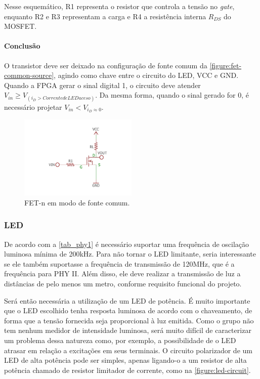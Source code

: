 	Nesse esquemático, R1 representa o resistor que controla a tensão no \textit{gate}, enquanto R2 e R3 representam a carga e R4 a resistência interna $R_{DS}$ do MOSFET.

	\paragraph*{Conclusão}

	O transistor deve ser deixado na configuração de fonte comum da \autoref{figure:fet-common-source}, agindo como chave entre o circuito do LED, VCC e GND. Quando a FPGA gerar o sinal digital 1, o circuito deve atender $V_{in} \geq V_{(i_{D} > Corrente de LED aceso)}$. Da mesma forma, quando o sinal gerado for 0, é necessário projetar  $V_{in} < V_{i_{D} \approx 0}$.

	\begin{figure}[h]
		\caption{\label{figure:fet-common-source}FET-n em modo de fonte comum.}
		\centering
		\includegraphics[width=0.5\textwidth, trim={0cm 2cm 0cm 2cm}, clip]{circuits/mosfet_example.pdf}
	\end{figure}

	\subsubsection*{LED}\label{method-hardware-led}

	De acordo com a \autoref{tab_phy1} é necessário suportar uma frequência de oscilação luminosa mínima de 200kHz. Para não tornar o LED limitante, seria interessante se ele também suportasse a frequência de transmissão de 120MHz, que é a frequência para PHY II. Além disso, ele deve realizar a transmissão de luz a distâncias de pelo menos um metro, conforme requisito funcional do projeto.

	Será então necessária a utilização de um LED de potência. É muito importante que o LED escolhido tenha resposta luminosa de acordo com o chaveamento, de forma que a tensão fornecida seja proporcional à luz emitida. Como o grupo não tem nenhum medidor de intensidade luminosa, será muito difícil de caracterizar um problema dessa natureza como, por exemplo, a possibilidade de o LED atrasar em relação a excitações em seus terminais. O circuito polarizador de um LED de alta potência pode ser simples, apenas ligando-o a um resistor de alta potência chamado de resistor limitador de corrente, como na \autoref{figure:led-circuit}.

